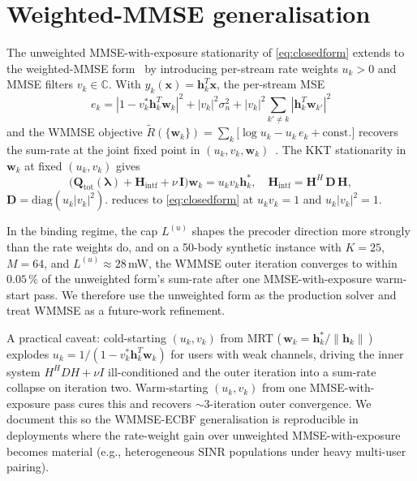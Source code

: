 \documentclass[journal,twocolumn,10pt]{IEEEtran}
\theoremstyle{plain}
\theoremstyle{remark}
\newcommand{\xx}{\mathbf{x}}
\newcommand{\hh}{\mathbf{h}}
\newcommand{\ww}{\mathbf{w}}
\newcommand{\Qmat}{\mathbf{Q}}
\newcommand{\Hintf}{\mathbf{H}_{\mathrm{intf}}}
\newcommand{\Complex}{\mathbb{C}}
\begin{document}
\section{Weighted-MMSE generalisation}\label{app:wmmse}

The unweighted MMSE-with-exposure stationarity of
\cref{eq:closedform} extends to the weighted-MMSE
form~\cite{Christensen2008,Shi2011} by introducing per-stream rate
weights $u_k > 0$ and MMSE filters $v_k \in \Complex$. With
$y_k(\xx) = \hh_k^T \xx$, the per-stream MSE
\begin{equation}\label{eq:wmmse-mse}
  e_k = |1 - v_k^* \hh_k^T \ww_k|^2 + |v_k|^2 \sigma_n^2 +
  |v_k|^2 \sum_{k' \neq k} |\hh_k^T \ww_{k'}|^2
\end{equation}
and the WMMSE objective
$\tilde R(\{\ww_k\}) = \sum_k\bigl[\log u_k - u_k\,e_k +
\mathrm{const.}\bigr]$ recovers the sum-rate at the joint
fixed point in $(u_k, v_k, \ww_k)$~\cite{Christensen2008}. The
KKT stationarity in $\ww_k$ at fixed $(u_k, v_k)$ gives
\begin{equation}\label{eq:KKT-wmmse}
  \bigl(\Qmat_{\mathrm{tot}}(\bm\lambda) + \Hintf + \nu\,
  \mathbf{I}\bigr) \ww_k = u_k v_k \hh_k^*,
  \quad
  \Hintf = \mathbf{H}^H\,\mathbf{D}\,\mathbf{H},
\end{equation}
$\mathbf{D} = \mathrm{diag}(u_k|v_k|^2)$. 
reduces to \cref{eq:closedform} at $u_k v_k = 1$ and $u_k|v_k|^2 = 1$.

In the binding regime, the cap $L^{(u)}$ shapes the precoder
direction more strongly than the rate weights do, and on a 50-body
synthetic instance with $K = 25$, $M = 64$, and $L^{(u)} \approx
28\,$mW, the WMMSE outer iteration converges to within $0.05\,\%$
of the unweighted form's sum-rate after one MMSE-with-exposure
warm-start pass. We therefore use the unweighted form as the
production solver and treat WMMSE as a future-work refinement.

A practical caveat: cold-starting $(u_k, v_k)$ from MRT
(\,$\ww_k = \hh_k^* / \|\hh_k\|$\,) explodes $u_k = 1/(1 - v_k^*
\hh_k^T \ww_k)$ for users with weak channels, driving the inner
system $H^H D H + \nu I$ ill-conditioned and the outer iteration
into a sum-rate collapse on iteration two. Warm-starting $(u_k, v_k)$
from one MMSE-with-exposure pass cures this and recovers
$\sim 3$-iteration outer convergence. We document this so the
WMMSE-ECBF generalisation is reproducible in deployments where the
rate-weight gain over unweighted MMSE-with-exposure becomes
material (e.g., heterogeneous SINR populations under heavy
multi-user pairing).
\end{document}
